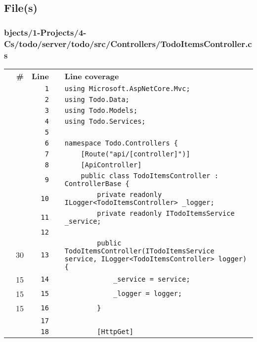 \documentclass[a4paper,landscape,10pt]{article}
\begin{document}
\subsection{File(s)}
\subsubsection{bjects/1-Projects/4-Cs/todo/server/todo/src/Controllers/TodoItemsController.cs}
\begin{longtable}[l]{lrrll}
\textbf{} & \textbf{\#} & \textbf{Line} & \textbf{} & \textbf{Line coverage}\\
\cellcolor{gray} &  & \verb~1~ & & \verb~using Microsoft.AspNetCore.Mvc;~\\
\cellcolor{gray} &  & \verb~2~ & & \verb~using Todo.Data;~\\
\cellcolor{gray} &  & \verb~3~ & & \verb~using Todo.Models;~\\
\cellcolor{gray} &  & \verb~4~ & & \verb~using Todo.Services;~\\
\cellcolor{gray} &  & \verb~5~ & & \verb~~\\
\cellcolor{gray} &  & \verb~6~ & & \verb~namespace Todo.Controllers {~\\
\cellcolor{gray} &  & \verb~7~ & & \verb~    [Route("api/[controller]")]~\\
\cellcolor{gray} &  & \verb~8~ & & \verb~    [ApiController]~\\
\cellcolor{gray} &  & \verb~9~ & & \verb~    public class TodoItemsController : ControllerBase {~\\
\cellcolor{gray} &  & \verb~10~ & & \verb~        private readonly ILogger<TodoItemsController> _logger;~\\
\cellcolor{gray} &  & \verb~11~ & & \verb~        private readonly ITodoItemsService _service;~\\
\cellcolor{gray} &  & \verb~12~ & & \verb~~\\
\cellcolor{green} & 30 & \verb~13~ & & \verb~        public TodoItemsController(ITodoItemsService service, ILogger<TodoItemsController> logger) {~\\
\cellcolor{green} & 15 & \verb~14~ & & \verb~            _service = service;~\\
\cellcolor{green} & 15 & \verb~15~ & & \verb~            _logger = logger;~\\
\cellcolor{green} & 15 & \verb~16~ & & \verb~        }~\\
\cellcolor{gray} &  & \verb~17~ & & \verb~~\\
\cellcolor{gray} &  & \verb~18~ & & \verb~        [HttpGet]~\\

\end{longtable}
\end{document}
